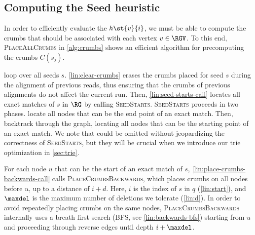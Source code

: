 

\subsection{Computing the Seed heuristic} \label{sec:algo}
%
In order to efficiently evaluate the \seedh $h\st{v}{i}$, we must be
able to compute the crumbs that should be associated with each vertex $v \in
\RGV$.
%
To this end, \textsc{PlaceAllCrumbs} in \cref{alg:crumbs} shows an efficient
algorithm for precomputing the crumbs $C(s_j)$.

 loop over all seeds $s$.
\cref{lin:clear-crumbs} erases the crumbs placed for seed $s$ during the
alignment of previous reads, thus ensuring that the crumbs of previous
alignments do not affect the current run. Then, \cref{lin:seed-starts-call}
locates all exact matches of $s$ in $\RG$ by calling \textsc{SeedStarts}.
\textsc{SeedStarts} proceeds in two phases.
 locate all nodes that can be
the end point of an exact match. Then,
 backtrack through
the graph, locating all nodes that can be the starting point of an exact match.
We note that  could be
omitted without jeopardizing the correctness of \textsc{SeedStarts}, but they
will be crucial when we introduce our trie optimization in \cref{sec:trie}.

For each node $u$ that can be the start of an exact match of $s$,
\cref{lin:place-crumbs-backwards-call} calls \textsc{PlaceCrumbsBackwards},
which places crumbs on all nodes before $u$, up to a distance of $i{+}d$. Here,
$i$ is the index of $s$ in $q$ (\cref{lin:start}), and $\maxdel$ is the maximum
number of deletions we tolerate (\cref{lin:d}).
%
In order to avoid repeatedly placing crumbs on the same nodes,
\textsc{PlaceCrumbsBackwards} internally uses a breath first search (BFS, see
\cref{lin:backwards-bfs}) starting from $u$ and proceeding through reverse edges
until depth $i + \maxdel$.